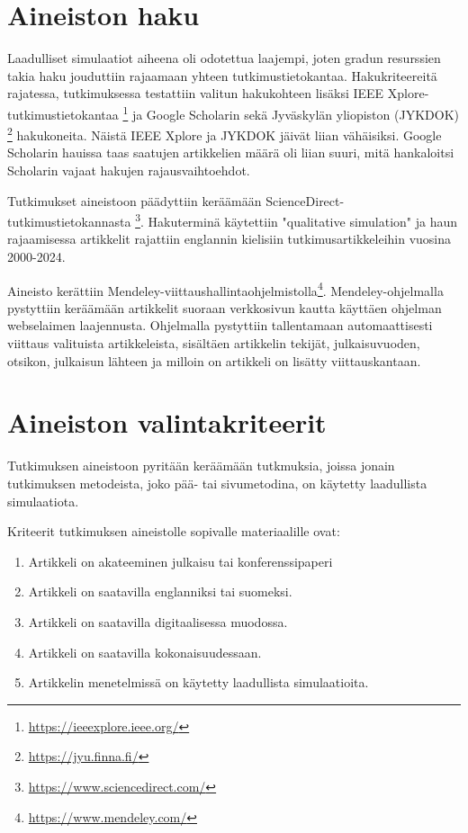 \documentclass[utf8]{gradu3}
\begin{document}
\section{Aineiston haku} \label{Hakusanat}
Laadulliset simulaatiot aiheena oli odotettua laajempi, joten gradun resurssien takia haku jouduttiin rajaamaan yhteen tutkimustietokantaa. Hakukriteereitä rajatessa, tutkimuksessa testattiin valitun hakukohteen lisäksi IEEE Xplore-tutkimustietokantaa \footnote{\url{https://ieeexplore.ieee.org/}} ja Google Scholarin sekä Jyväskylän yliopiston (JYKDOK) \footnote{\url{https://jyu.finna.fi/}} hakukoneita. Näistä IEEE Xplore ja JYKDOK jäivät liian vähäisiksi. Google Scholarin hauissa taas saatujen artikkelien määrä oli liian suuri, mitä hankaloitsi Scholarin vajaat hakujen rajausvaihtoehdot.

Tutkimukset aineistoon päädyttiin keräämään ScienceDirect-tutkimustietokannasta \footnote{\url{https://www.sciencedirect.com/}}. Hakuterminä käytettiin "qualitative simulation" ja haun rajaamisessa artikkelit rajattiin englannin kielisiin tutkimusartikkeleihin vuosina 2000-2024. 

Aineisto kerättiin Mendeley-viittaushallintaohjelmistolla\footnote{\url{https://www.mendeley.com/}}. Mendeley-ohjelmalla pystyttiin keräämään artikkelit suoraan verkkosivun kautta käyttäen ohjelman webselaimen laajennusta. Ohjelmalla pystyttiin tallentamaan automaattisesti viittaus valituista artikkeleista, sisältäen artikkelin tekijät, julkaisuvuoden, otsikon, julkaisun lähteen ja milloin on artikkeli on lisätty viittauskantaan.


\section{Aineiston valintakriteerit} \label{valintakriteerit}
Tutkimuksen aineistoon pyritään keräämään tutkmuksia, joissa jonain tutkimuksen metodeista, joko pää- tai sivumetodina, on käytetty laadullista simulaatiota.

Kriteerit tutkimuksen aineistolle sopivalle materiaalille ovat:
\begin{enumerate}
    \item Artikkeli on akateeminen julkaisu tai konferenssipaperi
    \item Artikkeli on saatavilla englanniksi tai suomeksi.
    \item Artikkeli on saatavilla digitaalisessa muodossa.
    \item Artikkeli on saatavilla kokonaisuudessaan.
    \item Artikkelin menetelmissä on käytetty laadullista simulaatioita.
\end{enumerate}
\end{document}
